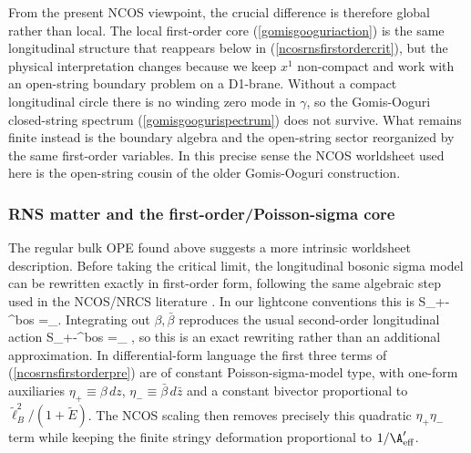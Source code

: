 \documentclass[12pt]{article}
\newcommand{\wt}[1]{\widetilde{#1}}
\begin{document}
From the present NCOS viewpoint, the crucial difference is therefore global rather than local. The local first-order core (\ref{gomisgooguriaction}) is the same longitudinal structure that reappears below in (\ref{ncosrnsfirstordercrit}), but the physical interpretation changes because we keep $x^1$ non-compact and work with an open-string boundary problem on a D1-brane. Without a compact longitudinal circle there is no winding zero mode in $\gamma$, so the Gomis-Ooguri closed-string spectrum (\ref{gomisgoogurispectrum}) does not survive. What remains finite instead is the boundary algebra and the open-string sector reorganized by the same first-order variables. In this precise sense the NCOS worldsheet used here is the open-string cousin of the older Gomis-Ooguri construction.
\subsubsection{RNS matter and the first-order/Poisson-sigma core}
\noindent
The regular bulk OPE found above suggests a more intrinsic worldsheet description. Before taking the critical limit, the longitudinal bosonic sigma model can be rewritten exactly in first-order form, following the same algebraic step used in the NCOS/NRCS literature \cite{gomis2000nonrelativisticclosedstringtheory}. In our lightcone conventions this is
\ie\label{ncosrnsfirstorderpre}
S_{+-}^{\rm bos}
=\int_\left[
\beta\,\bar\partial X^+
+\bar\beta\,\partial X^-
-{2\wt\ell_B^2\over 1+\widetilde E}\,\beta\bar\beta
+{1-\widetilde E\over 2\wt\ell_B^2}\,\partial X^+\bar\partial X^-
\right].
\fe
Integrating out $\beta,\bar\beta$ reproduces the usual second-order longitudinal action
\ie
S_{+-}^{\rm bos}
=\int_\Sigma {d^2z\over 4\pi\wt\ell_B^2}
,
\fe
so this is an exact rewriting rather than an additional approximation. In differential-form language the first three terms of (\ref{ncosrnsfirstorderpre}) are of constant Poisson-sigma-model type, with one-form auxiliaries $\eta_+\equiv \beta\,dz$, $\eta_-\equiv \bar\beta\,d\bar z$ and a constant bivector proportional to $\wt\ell_B^2/(1+\widetilde E)$. The NCOS scaling then removes precisely this quadratic $\eta_+\eta_-$ term while keeping the finite stringy deformation proportional to $1/\A'_{\rm eff}$.
\end{document}
